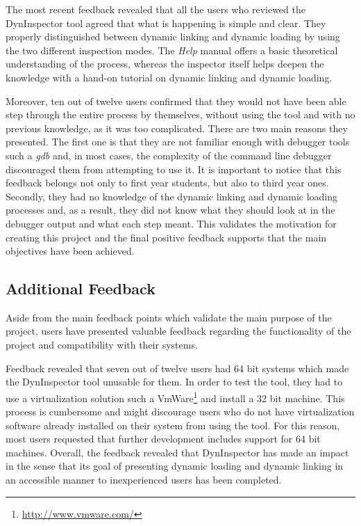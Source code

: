 The most recent feedback revealed that all the users who reviewed the DynInspector tool agreed that what is happening is simple and clear. They properly distinguished between dynamic linking and dynamic loading by using the two different inspection modes. The \textit{Help} manual offers a basic theoretical understanding of the process, whereas the inspector itself helps deepen the knowledge with a hand-on tutorial on dynamic linking and dynamic loading.

Moreover, ten out of twelve users confirmed that they would not have been able step through the entire process by themselves, without using the tool and with no previous knowledge, as it was too complicated. There are two main reasons they presented. The first one is that they are not familiar enough with debugger tools such a \textit{gdb} and, in most cases, the complexity of the command line debugger discouraged them from attempting to use it. It is important to notice that this feedback belongs not only to first year students, but also to third year ones. Secondly, they had no knowledge of the dynamic linking and dynamic loading processes and, as a result, they did not know what they should look at in the debugger output and what each step meant. This validates the motivation for creating this project and the final positive feedback supports that the main objectives have been achieved.
 
\subsection{Additional Feedback}

Aside from the main feedback points which validate the main purpose of the project, users have presented valuable feedback regarding the functionality of the project and compatibility with their systems.

Feedback revealed that seven out of twelve users had 64 bit systems which made the DynInspector tool unusable for them. In order to test the tool, they had to use a virtualization solution such a VmWare\footnote{\url{http://www.vmware.com/}} and install a 32 bit machine. This process is cumbersome and might discourage users who do not have virtualization software already installed on their system from using the tool. For this reason, most users requested that further development includes support for 64 bit machines.
Overall, the feedback revealed that DynInspector has made an impact in the sense that its goal of presenting dynamic loading and dynamic linking in an accessible manner to inexperienced users has been completed.